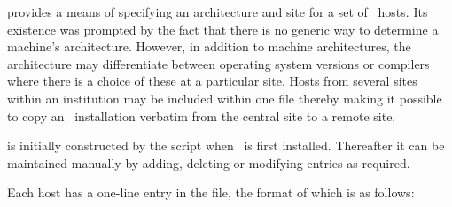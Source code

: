  provides a means of specifying an architecture and site for a
set of \aipspp\ hosts.  Its existence was prompted by the fact that there is
no generic way to determine a machine's architecture.  However, in addition to
machine architectures, the architecture may differentiate between operating
system versions or compilers where there is a choice of these at a particular
site.  Hosts from several sites within an institution may be included within
one  file thereby making it possible to copy an \aipspp\ 
installation verbatim from the central site to a remote site.

 is initially constructed by the  script
when \aipspp\ is first installed.  Thereafter it can be maintained manually by
adding, deleting or modifying entries as required.

Each host has a one-line entry in the  file, the format of
which is as follows:

